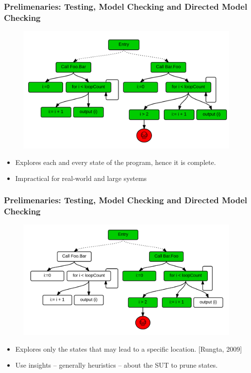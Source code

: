 \documentclass{beamer}
\begin{document}
\begin{frame}
\frametitle{Prelimenaries: Testing, \textbf{Model Checking} and Directed Model Checking}

\begin{figure}
\includegraphics[width=0.75\linewidth]{media/mc.png}
\end{figure}

\begin{itemize}
\item Explores each and every state of the program, hence it is complete.
\item Impractical for real-world and large systems
\end{itemize}

\end{frame}


\begin{frame}
\frametitle{Prelimenaries: Testing, Model Checking and \textbf{Directed Model Checking}}

\begin{figure}
\includegraphics[width=0.75\linewidth]{media/dmc.png}
\end{figure}

\begin{itemize}
\item Explores only the states that may lead to a
specific location. [Rungta, 2009]
\item Use insights -- generally heuristics -- about the SUT to prune states.
\end{itemize}

\end{frame}
\end{document}
